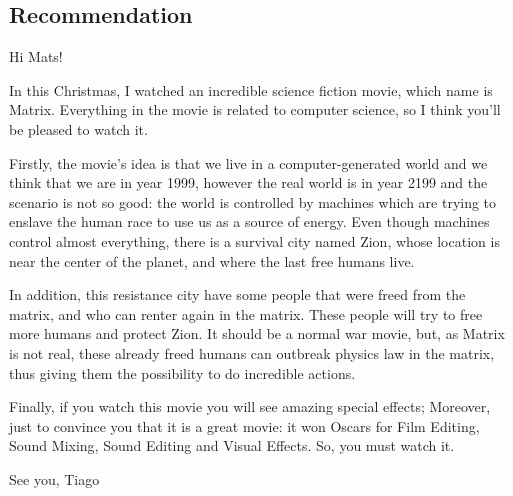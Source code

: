 \documentclass[a4paper,12pt]{article}
\begin{document}


\subsection*{Recommendation}

Hi Mats!

In this Christmas, I watched an incredible science fiction movie, which name is Matrix. Everything in the  movie is related to computer science, so  I think you'll be  
pleased to watch it.



Firstly,   the movie's idea is  that   we  live  in  a
computer-generated world and we think that we are in year 1999, however the real
world is  in  year 2199 and the scenario is not so good: the world
is controlled  by machines which are  trying to enslave  the human race to use   us as  a source  of energy.  Even though  machines  control almost
everything, there  is a  survival city  named Zion, whose  location is  near the
center of the planet, and where the last free humans live.

In addition, this resistance city have some people that  were freed from the
matrix, and who  can renter again in  the matrix. These people will  try to free
more humans and protect Zion. It should be a normal war movie, but, as Matrix is
not real,  these already freed  humans can outbreak  physics law in  the matrix,
thus giving them the possibility to do incredible actions. 

Finally, if you watch this movie you will see amazing special effects; Moreover,
just to convince you that it is a great movie: it won  Oscars for Film Editing,
Sound Mixing, Sound Editing and Visual Effects. So, you must watch it.

See you,
Tiago
\end{document}
